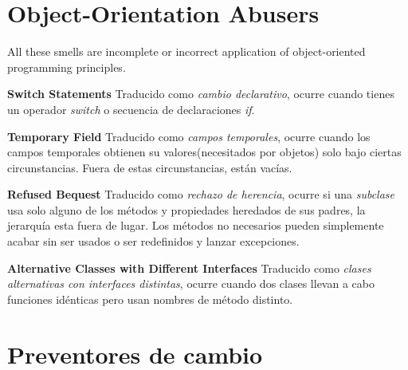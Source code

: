 \documentclass[11pt,a4paper,oneside]{book}
\begin{document}
    
    
    
    
    



\section{Object-Orientation Abusers} 
\label{Object-OrientationAbusers}
All these smells are incomplete or incorrect application of object-oriented programming principles.
    \newline
    
    \textbf{Switch Statements} \newline
    Traducido como \textit{cambio declarativo}, ocurre cuando tienes un operador \textit{switch} o secuencia de declaraciones \textit{if}.
    \newline
    
    \textbf{Temporary Field}  \newline
    Traducido como \textit{campos temporales}, ocurre cuando los campos temporales obtienen su valores(necesitados por objetos) solo bajo ciertas circunstancias. Fuera de estas circunstancias, están vacías.
    \newline
    
    \textbf{Refused Bequest}  \newline
    Traducido como \textit{rechazo de herencia}, ocurre si una \textit{subclase} usa solo alguno de los métodos y propiedades heredados de sus padres, la jerarquía esta fuera de lugar. Los métodos no necesarios pueden simplemente acabar sin ser usados o ser redefinidos y lanzar excepciones.
    \newline
    
    \textbf{Alternative Classes with Different Interfaces}  \newline
    Traducido como \textit{clases alternativas con interfaces distintas}, ocurre cuando dos clases llevan a cabo funciones idénticas pero usan nombres de método distinto.
    \newline



\section{Preventores de cambio}
\end{document}
